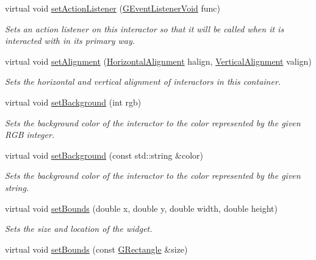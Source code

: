 \begin{DoxyCompactItemize}
virtual void \mbox{\hyperlink{classsgl_1_1GInteractor_aebd20a89c7a8a43a6fce999cf4f9fcf2}{set\+Action\+Listener}} (\mbox{\hyperlink{namespacesgl_a54427ce97bb1c2804e4fe2b0a62e8b17}{G\+Event\+Listener\+Void}} func)
\begin{DoxyCompactList}\small\item\em Sets an action listener on this interactor so that it will be called when it is interacted with in its primary way. \end{DoxyCompactList}\item 
virtual void \mbox{\hyperlink{classsgl_1_1GContainer_a0bcf8805d87afc9bb4c6ca238ca7c0bd}{set\+Alignment}} (\mbox{\hyperlink{namespacesgl_aa00e70829e72ff16addc4d9f06fe3bc5}{Horizontal\+Alignment}} halign, \mbox{\hyperlink{namespacesgl_a9c2ed22cfbd21f13df24ea193b310aee}{Vertical\+Alignment}} valign)
\begin{DoxyCompactList}\small\item\em Sets the horizontal and vertical alignment of interactors in this container. \end{DoxyCompactList}\item 
virtual void \mbox{\hyperlink{classsgl_1_1GInteractor_acba7e546c2025c0a15ca4b4cc92043db}{set\+Background}} (int rgb)
\begin{DoxyCompactList}\small\item\em Sets the background color of the interactor to the color represented by the given R\+GB integer. \end{DoxyCompactList}\item 
virtual void \mbox{\hyperlink{classsgl_1_1GInteractor_ab4677ab2474e68b07aa56605af92a84a}{set\+Background}} (const std\+::string \&color)
\begin{DoxyCompactList}\small\item\em Sets the background color of the interactor to the color represented by the given string. \end{DoxyCompactList}\item 
virtual void \mbox{\hyperlink{classsgl_1_1GInteractor_a2aae8197624b72265ab83b4f1bc73f2f}{set\+Bounds}} (double x, double y, double width, double height)
\begin{DoxyCompactList}\small\item\em Sets the size and location of the widget. \end{DoxyCompactList}\item 
virtual void \mbox{\hyperlink{classsgl_1_1GInteractor_acada386653f008cacc7cce86426bef7c}{set\+Bounds}} (const \mbox{\hyperlink{structsgl_1_1GRectangle}{G\+Rectangle}} \&size)

\end{DoxyCompactItemize}

